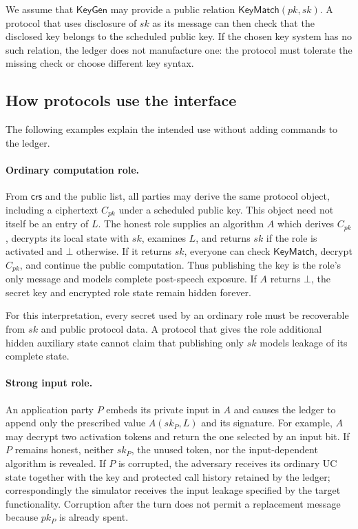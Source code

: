 We assume that $\mathsf{KeyGen}$ may provide a public relation
$\mathsf{KeyMatch}(pk,sk)$. A protocol that uses disclosure of $sk$ as its
message can then check that the disclosed key belongs to the scheduled
public key. If the chosen key system has no such relation, the ledger does
not manufacture one: the protocol must tolerate the missing check or choose
different key syntax.

\subsection{How protocols use the interface}

The following examples explain the intended use without adding commands to
the ledger.

\paragraph{Ordinary computation role.}
From $\mathsf{crs}$ and the public list, all parties may derive the same
protocol object, including a ciphertext $C_{pk}$ under a scheduled public
key. This object need not itself be an entry of $L$. The honest role supplies
an algorithm $A$ which derives $C_{pk}$, decrypts its local state with $sk$,
examines $L$, and returns $sk$ if the role is activated and $\bot$ otherwise.
If it returns $sk$, everyone can check $\mathsf{KeyMatch}$, decrypt
$C_{pk}$, and continue the public computation. Thus publishing the key is the
role's only message and models complete post-speech exposure. If $A$ returns
$\bot$, the secret key and encrypted role state remain hidden forever.

For this interpretation, every secret used by an ordinary role must be
recoverable from $sk$ and public protocol data. A protocol that gives the
role additional hidden auxiliary state cannot claim that publishing only
$sk$ models leakage of its complete state.

\paragraph{Strong input role.}
An application party $P$ embeds its private input in $A$ and causes the
ledger to append only the prescribed value $A(sk_P,L)$ and its signature.
For example, $A$ may decrypt two activation tokens and return the one selected
by an input bit. If $P$ remains honest, neither $sk_P$, the unused token, nor
the input-dependent algorithm is revealed. If $P$ is corrupted, the
adversary receives its ordinary UC state together with the key and protected
call history retained by the ledger; correspondingly the simulator receives
the input leakage specified by the target functionality. Corruption after
the turn does not permit a replacement message because $pk_P$ is already
spent.

